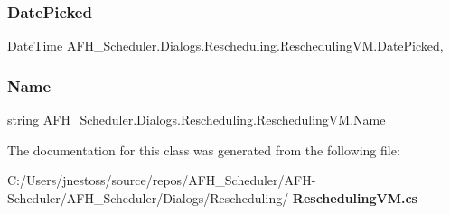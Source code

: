 \subsubsection{DatePicked}
{\footnotesize\ttfamily Date\+Time A\+F\+H\+\_\+\+Scheduler.\+Dialogs.\+Rescheduling.\+Rescheduling\+V\+M.\+Date\+Picked\hspace{0.3cm}{\ttfamily [get]}, {\ttfamily [set]}}

\mbox{\label{class_a_f_h___scheduler_1_1_dialogs_1_1_rescheduling_1_1_rescheduling_v_m_a64e9e94014970eb7fbb577e53b6c7a05}} 
\subsubsection{Name}
{\footnotesize\ttfamily string A\+F\+H\+\_\+\+Scheduler.\+Dialogs.\+Rescheduling.\+Rescheduling\+V\+M.\+Name\hspace{0.3cm}{\ttfamily [get]}}



The documentation for this class was generated from the following file\+:\begin{DoxyCompactItemize}
\item 
C\+:/\+Users/jnestoss/source/repos/\+A\+F\+H\+\_\+\+Scheduler/\+A\+F\+H-\/\+Scheduler/\+A\+F\+H\+\_\+\+Scheduler/\+Dialogs/\+Rescheduling/\textbf{ Rescheduling\+V\+M.\+cs}\end{DoxyCompactItemize}
